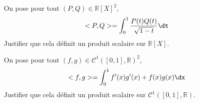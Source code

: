 \documentclass[a4paper,10pt]{report}
\begin{document}
\begin{Exercice}{}\label{PS} On pose pour tout $(P,Q) \in \mathbb{R}[X]^2$,
$$ <P,Q> = \int_{0}^1 \dfrac{P(t)Q(t)}{\sqrt{1-t}} \dt $$
Justifier que cela définit un produit scalaire sur $\mathbb{R}[X]$.
\end{Exercice}

%
%
%


\begin{Exercice}{} \label{PS2} On pose pour tout $(f,g) \in \mathcal{C}^1([0,1],\mathbb{R})^2$,
$$ <f,g> = \int_{0}^1 f'(x)g'(x)+f(x)g(x) \dx$$
Justifier que cela définit un produit scalaire sur $\mathcal{C}^1([0,1],\mathbb{R})$.
\end{Exercice} 
\end{document}
